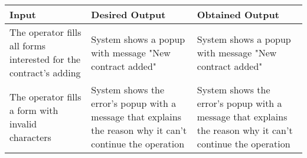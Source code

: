 {{{\begin{center}
			\begin{tabular}{|p{4cm}|p{5cm}|p{5cm}|}
			\hline
			\centering \vspace{1mm} \bfseries{Input} \vspace{1mm} & \vspace{1mm} \bfseries{Desired Output} \vspace{1mm} & \vspace{1mm} \bfseries{Obtained Output} \vspace{1mm}\\
			\hline
				\vspace{1mm} The operator fills all forms interested for the contract's adding \vspace{1mm} &
				\vspace{1mm} System shows a popup with message "New contract added" \vspace{1mm} & 
				\vspace{1mm} System shows a popup with message "New contract added" \vspace{1mm} \\
			\hline
				\vspace{1mm} The operator fills a form with invalid characters \vspace{1mm} &
				\vspace{1mm} System shows the error's popup with a message that explains the reason why it can't continue the operation \vspace{1mm} & 
				\vspace{1mm} System shows the error's popup with a message that explains the reason why it can't continue the operation \vspace{1mm} \\
			\hline
			\end{tabular}
			\end{center}
		}
		\clearpage

}}
